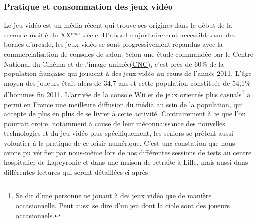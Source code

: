 		\subsubsection*{Pratique et consommation des jeux vidéo}
Le jeu vidéo est un média récent qui trouve ses origines dans le début de la seconde moitié du XX$^{eme}$ siècle. D'abord majoritairement accessibles sur des bornes d'arcade, les jeux vidéo se sont progressivement répandus avec la commercialisation de consoles de salon. Selon une étude commandée par le Centre National du Cinéma et de l'image animée\href{http://www.cnc.fr}{(CNC)}, c'est près de 60\% de la population française qui jouaient à des jeux vidéo au cours de l'année 2011\cite{Cnc11}. L'âge moyen des joueurs était alors de 34,7 ans et cette population constituée de 54,1\% d'hommes fin 2011\cite{Cnc11}. L'arrivée de la console Wii et de jeux orientés plus casuals\footnote{Se dit d'une personne ne jouant à des jeux vidéo que de manière occasionnelle. Peut aussi se dire d'un jeu dont la cible sont des joueurs occasionnels.} a permi en France une meilleure diffusion du média au sein de la population, qui accepte de plus en plus de se livrer à cette activité. Contrairement à ce que l'on pourrait croire, notamment à cause de leur méconnaissance des nouvelles technologies et du jeu vidéo plus spécifiquement, les seniors se prêtent aussi volontier à la pratique de ce loisir numérique. C'est une constation que nous avons pu vérifier par nous-même lors de nos différentes sessions de tests au centre hospitalier de Lapeyronie et dans une maison de retraite à Lille, mais aussi dans différentes lectures qui seront détaillées ci-après.
	
